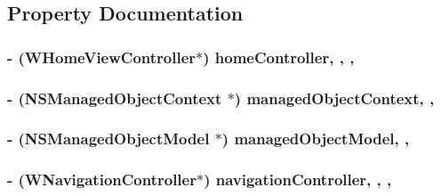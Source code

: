 \subsection{Property Documentation}
\hypertarget{interface_w_app_delegate_abf36af1cbff7bc7efe6a1d4657b409ea}{
\subsubsection[{home\-Controller}]{\setlength{\rightskip}{0pt plus 5cm}-\/ ({\bf W\-Home\-View\-Controller}$\ast$) home\-Controller\hspace{0.3cm}{\ttfamily [read]}, {\ttfamily [write]}, {\ttfamily [nonatomic]}, {\ttfamily [strong]}}}\label{interface_w_app_delegate_abf36af1cbff7bc7efe6a1d4657b409ea}
\hypertarget{interface_w_app_delegate_ad9f6905d927fb7dd4ba9472ddc6ece8a}{
\subsubsection[{managed\-Object\-Context}]{\setlength{\rightskip}{0pt plus 5cm}-\/ (N\-S\-Managed\-Object\-Context $\ast$) managed\-Object\-Context\hspace{0.3cm}{\ttfamily [read]}, {\ttfamily [nonatomic]}, {\ttfamily [strong]}}}\label{interface_w_app_delegate_ad9f6905d927fb7dd4ba9472ddc6ece8a}
\hypertarget{interface_w_app_delegate_a808e2b55e6450a1cb780baac6080d170}{
\subsubsection[{managed\-Object\-Model}]{\setlength{\rightskip}{0pt plus 5cm}-\/ (N\-S\-Managed\-Object\-Model $\ast$) managed\-Object\-Model\hspace{0.3cm}{\ttfamily [read]}, {\ttfamily [nonatomic]}, {\ttfamily [strong]}}}\label{interface_w_app_delegate_a808e2b55e6450a1cb780baac6080d170}
\hypertarget{interface_w_app_delegate_ad0c4d65d6a08f4445cbcb49384b881c7}{
\subsubsection[{navigation\-Controller}]{\setlength{\rightskip}{0pt plus 5cm}-\/ ({\bf W\-Navigation\-Controller}$\ast$) navigation\-Controller\hspace{0.3cm}{\ttfamily [read]}, {\ttfamily [write]}, {\ttfamily [nonatomic]}, {\ttfamily [strong]}}}\label{interface_w_app_delegate_ad0c4d65d6a08f4445cbcb49384b881c7}
